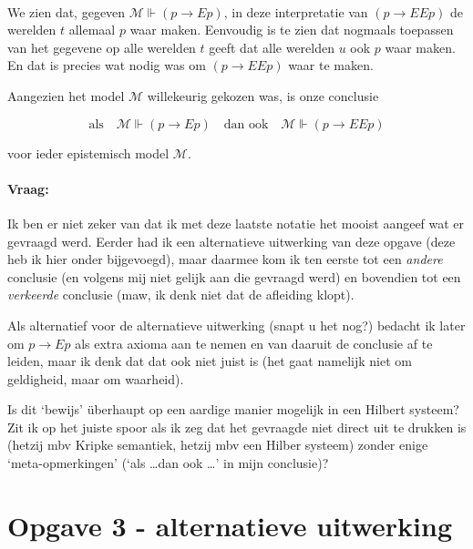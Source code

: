 \documentclass[a4paper,11pt]{article}
\begin{document}
\paragraph{}

We zien dat, gegeven $\mathcal{M} \Vdash (p \to E p)$, in deze interpretatie
van $(p \to E E p)$ de werelden $t$ allemaal $p$ waar maken. Eenvoudig is te
zien dat nogmaals toepassen van het gegevene op alle werelden $t$ geeft dat
alle werelden $u$ ook $p$ waar maken. En dat is precies wat nodig was om $(p
\to E E p)$ waar te maken.

Aangezien het model $\mathcal{M}$ willekeurig gekozen was, is onze conclusie

\begin{displaymath}
\mbox{als} \quad \mathcal{M} \Vdash (p \to E p) \quad \mbox{dan ook} \quad \mathcal{M} \Vdash(p \to E E p)
\end{displaymath}

voor ieder epistemisch model $\mathcal{M}$.

\paragraph{Vraag:}

Ik ben er niet zeker van dat ik met deze laatste notatie het mooist aangeef
wat er gevraagd werd. Eerder had ik een alternatieve uitwerking van deze
opgave (deze heb ik hier onder bijgevoegd), maar daarmee kom ik ten eerste tot
een \emph{andere} conclusie (en volgens mij niet gelijk aan die gevraagd werd)
en bovendien tot een \emph{verkeerde} conclusie (maw, ik denk niet dat de
afleiding klopt).

Als alternatief voor de alternatieve uitwerking (snapt u het nog?) bedacht ik
later om $p \to E p$ als extra axioma aan te nemen en van daaruit de conclusie
af te leiden, maar ik denk dat dat ook niet juist is (het gaat namelijk niet
om geldigheid, maar om waarheid).

Is dit `bewijs' \"uberhaupt op een aardige manier mogelijk in een Hilbert
systeem? Zit ik op het juiste spoor als ik zeg dat het gevraagde niet direct
uit te drukken is (hetzij mbv Kripke semantiek, hetzij mbv een Hilber systeem)
zonder enige `meta-opmerkingen' (`als \ldots dan ook \ldots' in mijn
conclusie)?


\section*{Opgave 3 - alternatieve uitwerking}
\end{document}
